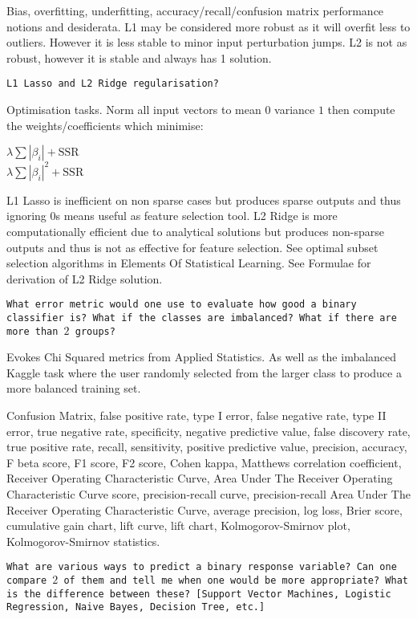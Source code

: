 Bias, overfitting, underfitting, accuracy/recall/confusion matrix performance notions and desiderata. L1 may be considered more robust as it will overfit less to outliers. However it is less stable to minor input perturbation jumps. L2 is not as robust, however it is stable and always has 1 solution.

\texttt{L1 Lasso and L2 Ridge regularisation?}

Optimisation tasks. Norm all input vectors to mean $0$ variance $1$ then compute the weights/coefficients which minimise:

$\lambda \sum |\beta_i| + \text{SSR}$ \\
$\lambda \sum |\beta_i|^2 + \text{SSR}$

L1 Lasso is inefficient on non sparse cases but produces sparse outputs and thus ignoring 0s means useful as feature selection tool. L2 Ridge is more computationally efficient due to analytical solutions but produces non-sparse outputs and thus is not as effective for feature selection. See optimal subset selection algorithms in Elements Of Statistical Learning. See Formulae for derivation of L2 Ridge solution.

\texttt{What error metric would one use to evaluate how good a binary classifier is? What if the classes are imbalanced? What if there are more than $2$ groups?}

Evokes Chi Squared metrics from Applied Statistics. As well as the imbalanced Kaggle task where the user randomly selected from the larger class to produce a more balanced training set.

Confusion Matrix, false positive rate, type I error, false negative rate, type II error, true negative rate, specificity, negative predictive value, false discovery rate, true positive rate, recall, sensitivity, positive predictive value, precision, accuracy, F beta score, F1 score, F2 score, Cohen kappa, Matthews correlation coefficient, Receiver Operating Characteristic Curve, Area Under The Receiver Operating Characteristic Curve score, precision-recall curve, precision-recall Area Under The Receiver Operating Characteristic Curve, average precision, log loss, Brier score, cumulative gain chart, lift curve, lift chart, Kolmogorov-Smirnov plot, Kolmogorov-Smirnov statistics.

\texttt{What are various ways to predict a binary response variable? Can one compare $2$ of them and tell me when one would be more appropriate? What is the difference between these? [Support Vector Machines, Logistic Regression, Naive Bayes, Decision Tree, etc.]}

